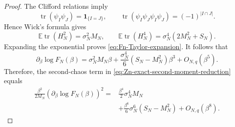 \documentclass[11pt]{article}
\newcommand{\E}{\mathbb{E}}
\newcommand{\tr}{\operatorname{tr}}
\newcommand{\ind}{\mathbf{1}}
\begin{document}
\begin{proof}
  The Clifford relations imply
  \begin{equation}\label{eq:Clifford-two-four-traces}
    \tr(\psi_I\psi_J)
    =
    \ind_{\{I=J\}},
    \qquad
    \tr(\psi_I\psi_J\psi_I\psi_J)
    =
    (-1)^{|I\cap J|}.
  \end{equation}
  Hence Wick's formula gives
  \begin{equation}\label{eq:H2-H4-annealed}
    \E\tr(H_N^2)
    =
    \sigma_N^2M_N,
    \qquad
    \E\tr(H_N^4)
    =
    \sigma_N^4
    \left(
      2M_N^2+S_N
    \right).
  \end{equation}
  Expanding the exponential proves \eqref{eq:Fn-Taylor-expansion}.
  It follows that
  \begin{equation}\label{eq:log-Fn-derivative-Taylor}
    \partial_\beta\log F_N(\beta)
    =
    \sigma_N^2M_N\beta
    +
    \frac{\sigma_N^4}{6}
    \left(
      S_N-M_N^2
    \right)\beta^3
    +
    O_{N,q}(\beta^5).
  \end{equation}
  Therefore, the second-chaos term in
  \eqref{eq:Zn-exact-second-moment-reduction} equals
  \begin{equation}\label{eq:Zn-second-chaos-Taylor}
    \begin{aligned}
      \frac{\beta^2}{2M_N}
      \left(
        \partial_\beta\log F_N(\beta)
      \right)^2
      ={}&
      \frac{\beta^4}{2}\sigma_N^4M_N
      \\
      &+
      \frac{\beta^6}{6}\sigma_N^6
      \left(
        S_N-M_N^2
      \right)
      +
      O_{N,q}(\beta^8).
    \end{aligned}
  \end{equation}


\end{proof}
\end{document}
